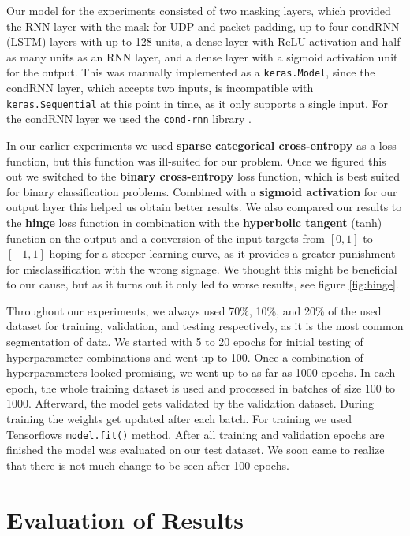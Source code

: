 \documentclass[
	ngerman,
	ruledheaders=section,%
	class=report,%
	thesis={type=bachelor},%
	accentcolor=9c,%
	custommargins=true,%
	marginpar=false,%
	parskip=half-,%
	fontsize=11pt,%
	twoside
]{tudapub}
\let\code\texttt
\begin{document}
Our model for the experiments consisted of two masking layers, which provided the RNN layer with the mask for UDP and packet padding,
up to four condRNN (LSTM) layers with up to 128 units,
a dense layer with ReLU activation and half as many units as an RNN layer,
and a dense layer with a sigmoid activation unit for the output.
This was manually implemented as a \code{keras.Model}, since the condRNN layer, which accepts two inputs, is incompatible with \code{keras.Sequential} at this point in time, as it only supports a single input.
For the condRNN layer we used the \code{cond-rnn} library \cite{remyPhilipperemyCondRnn2020}.

In our earlier experiments we used \textbf{sparse categorical cross-entropy} as a loss function, but this function was ill-suited for our problem.
Once we figured this out we switched to the \textbf{binary cross-entropy} loss function, which is best suited for binary classification problems.
Combined with a \textbf{sigmoid activation} for our output layer this helped us obtain better results.
We also compared our results to the \textbf{hinge} loss function in combination with the \textbf{hyperbolic tangent} (tanh) function on the output and a conversion of the input targets from $[0,1]$ to $[-1,1]$ hoping for a steeper learning curve, as it provides a greater punishment for misclassification with the wrong signage.
We thought this might be beneficial to our cause, but as it turns out it only led to worse results, see figure \ref{fig:hinge}.

Throughout our experiments, we always used 70\%, 10\%, and 20\% of the used dataset for training, validation, and testing respectively, as it is the most common segmentation of data.
We started with 5 to 20 epochs for initial testing of hyperparameter combinations and went up to 100.
Once a combination of hyperparameters looked promising, we went up to as far as 1000 epochs.
In each epoch, the whole training dataset is used and processed in batches of size 100 to 1000.
Afterward, the model gets validated by the validation dataset.
During training the weights get updated after each batch. %
For training we used Tensorflows \code{model.fit()} method.
After all training and validation epochs are finished the model was evaluated on our test dataset.
We soon came to realize that there is not much change to be seen after 100 epochs.

\section{Evaluation of Results}
\label{sec:exEval}
\end{document}
